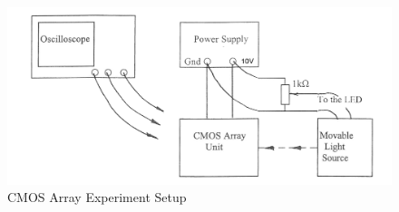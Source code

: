 





\begin{figure}[H]
\begin{center}
\includegraphics[width=1\linewidth]{LabFour/setup}
\end{center}
\caption{CMOS Array Experiment Setup}
\label{fig:cmossetup}
\end{figure}


